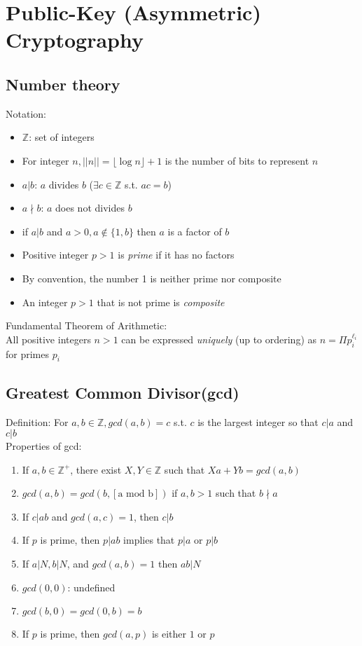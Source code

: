 \section{Public-Key (Asymmetric) Cryptography}

\subsection*{Number theory}
Notation:
\begin{itemize}
    \item $\mathbb{Z}$: set of integers
    \item For integer $n,||n||=\lfloor \log n \rfloor + 1$ is the number of 
    bits to represent $n$
    \item $a|b$: $a$ divides $b$ ($\exists c\in \mathbb{Z}$ s.t. $ac=b$)
    \item $a\nmid b$: $a$ does not divides $b$
    \item if $a|b$ and $a>0,a\notin \{1,b\}$ then $a$ is a factor of $b$
    \item Positive integer $p>1$ is \emph{prime} if it has no factors
    \item By convention, the number 1 is neither prime nor composite
    \item An integer $p>1$ that is not prime is \emph{composite}
\end{itemize}
Fundamental Theorem of Arithmetic:\\
All positive integers $n > 1$ can be expressed \emph{uniquely} (up to ordering) as
 $n=\Pi p_i^{\ell_i}$ for primes $p_i$

\subsection*{Greatest Common Divisor(gcd)}
Definition: For $a,b\in \mathbb{Z},gcd(a,b)=c$ s.t. $c$ is the largest integer
so that $c|a$ and $c|b$\\
Properties of gcd:
\begin{enumerate}
    \item If $a,b\in \mathbb{Z}^+$, there exist $X,Y\in \mathbb{Z}$ such that
    $Xa+Yb=gcd(a,b)$
    \item $gcd(a,b)=gcd(b,[\text{a mod b}])$ if $a,b>1$ such that $b \nmid a$
    \item If $c|ab$ and $gcd(a,c)=1$, then $c|b$
    \item If $p$ is prime, then $p|ab$ implies that $p|a$ or $p|b$
    \item If $a|N,b|N$, and $gcd(a,b)=1$ then $ab|N$
    \item $gcd(0,0)$: undefined
    \item $gcd(b,0)=gcd(0,b)=b$
    \item If $p$ is prime, then $gcd(a,p)$ is either $1$ or $p$
\end{enumerate}

